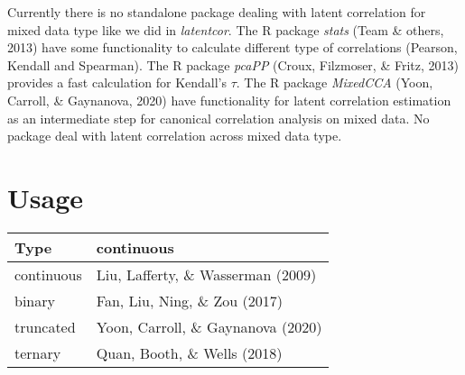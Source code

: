 \documentclass[10pt,a4paper,onecolumn]{article}
\begin{document}
Currently there is no standalone package dealing with latent correlation
for mixed data type like we did in \emph{latentcor}. The R package
\emph{stats} (Team \& others, 2013) have some functionality to calculate
different type of correlations (Pearson, Kendall and Spearman). The R
package \emph{pcaPP} (Croux, Filzmoser, \& Fritz, 2013) provides a fast
calculation for Kendall's \(\tau\). The R package \emph{MixedCCA} (Yoon,
Carroll, \& Gaynanova, 2020) have functionality for latent correlation
estimation as an intermediate step for canonical correlation analysis on
mixed data. No package deal with latent correlation across mixed data
type.

\hypertarget{usage}{%
\section{Usage}\label{usage}}

\begin{longtable}[]{@{}ll@{}}
\toprule
Type & continuous \\
\midrule
\endhead
continuous & Liu, Lafferty, \& Wasserman (2009) \\
binary & Fan, Liu, Ning, \& Zou (2017) \\
truncated & Yoon, Carroll, \& Gaynanova (2020) \\
ternary & Quan, Booth, \& Wells (2018) \\
\bottomrule
\end{longtable}
\end{document}
